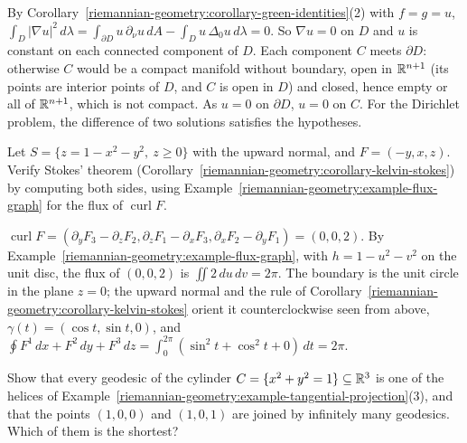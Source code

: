 \begin{solution}
By Corollary~\ref{riemannian-geometry:corollary-green-identities}(2) with $f = g = u$, $\int_D|\nabla u|^2\,d\lambda = \int_{\partial D}u\,\partial_\nu u\,dA - \int_Du\,\Delta_0u\,d\lambda = 0$. So $\nabla u = 0$ on $D$ and $u$ is
constant on each connected component of $D$. Each component $C$ meets $\partial D$: otherwise $C$ would be a compact manifold without boundary, open in $\mathbb{R}^{n+1}$ (its points are interior points of $D$, and $C$
is open in $D$) and closed, hence empty or all of $\mathbb{R}^{n+1}$, which is not compact. As $u = 0$ on $\partial D$, $u = 0$ on $C$. For the Dirichlet problem, the difference of two solutions satisfies the
hypotheses.
\end{solution}

\begin{exercise}\label{riemannian-geometry:exercise-stokes-paraboloid}
Let $S = \{z = 1 - x^2 - y^2,\ z \geq 0\}$ with the upward normal, and $F = (-y, x, z)$. Verify Stokes' theorem (Corollary~\ref{riemannian-geometry:corollary-kelvin-stokes}) by computing both sides, using
Example~\ref{riemannian-geometry:example-flux-graph} for the flux of $\operatorname{curl}F$.
\end{exercise}

\begin{solution}
$\operatorname{curl}F = (\partial_yF_3 - \partial_zF_2, \partial_zF_1 - \partial_xF_3, \partial_xF_2 - \partial_yF_1) = (0, 0, 2)$. By Example~\ref{riemannian-geometry:example-flux-graph}, with $h = 1 - u^2 - v^2$ on the unit disc, the
flux of $(0, 0, 2)$ is $\iint2\,du\,dv = 2\pi$. The boundary is the unit circle in the plane $z = 0$; the upward normal and the rule of Corollary~\ref{riemannian-geometry:corollary-kelvin-stokes} orient it
counterclockwise seen from above, $\gamma(t) = (\cos t, \sin t, 0)$, and $\oint F^1\,dx + F^2\,dy + F^3\,dz = \int_0^{2\pi}(\sin^2t + \cos^2t + 0)\,dt = 2\pi$.
\end{solution}

\begin{exercise}\label{riemannian-geometry:exercise-cylinder-geodesics}
Show that every geodesic of the cylinder $C = \{x^2 + y^2 = 1\} \subseteq \mathbb{R}^3$ is one of the helices of Example~\ref{riemannian-geometry:example-tangential-projection}(3), and that the points $(1, 0, 0)$ and
$(1, 0, 1)$ are joined by infinitely many geodesics. Which of them is the shortest?
\end{exercise}

